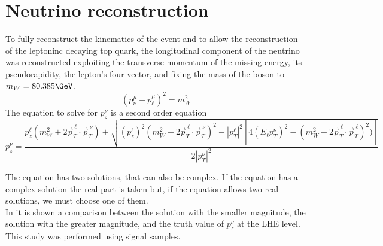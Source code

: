 \section{Neutrino reconstruction}
To fully reconstruct the kinematics of the event and to allow the reconstruction of the leptoninc decaying top quark, the longitudinal component of the neutrino was reconstructed exploiting the transverse momentum of the missing energy, its pseudorapidity, the lepton's four vector, and fixing the mass of the \PW boson to $m_W=80.385 \GeV$.
\begin{equation}
    (p^\mu_\nu+p^\mu_\ell)^2=m_W^2 
\end{equation}
The equation to solve for $p_z^{\nu}$ is a second order equation
\begin{equation*}
    p_z^\nu=\dfrac{p_z^\ell(m_W^2+2\vec{p}_T^{\:\ell} \cdot \vec{p}_T^{\:\nu})\pm\sqrt{(p_z^\ell)^2 (m_W^2+2\vec{p}_T^{\:\ell} \cdot \vec{p}_T^{\:\nu})^2-|p_T^\ell|^2[4(E_\ell p_T^\nu)^2-(m_W^2+2\vec{p}_T^{\:\ell} \cdot \vec{p}_T^{\:\ell})^2)]}}{2|p_T^\nu|^2}
\end{equation*}

The equation has two solutions, that can also be complex. If the equation has a complex solution the real part is taken but, if the equation allows two real solutions, we must choose one of them.\\
In  it is shown a comparison between the solution with the smaller magnitude, the solution with the greater magnitude, and the truth value of $p_z^\nu$ at the LHE level.\\
This study was performed using signal samples.


